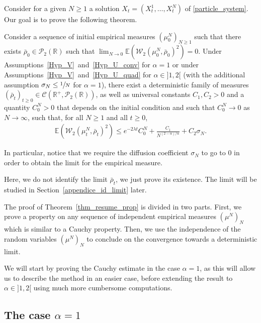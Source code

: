 Consider for a given $N\geq1$ a solution $X_t=(X^1_t,\dots, X^N_t)$ of \eqref{particle_system}. Our goal is to prove the following theorem.

\begin{theorem}\label{thm_resume_prop}
Consider a sequence of initial empirical measures $(\mu^N_0)_{N\geq1}$ such that there exists $\bar{\rho}_0 \in \mathcal P_2(\mathbb R)$ such that $\lim_{N\to0}\mathbb{E}\left(\mathcal{W}_2(\mu^N_0,\bar{\rho}_0)^2\right)=0$. Under Assumptions~\ref{Hyp_V}~and~\ref{Hyp_U_conv} for $\alpha=1$ or under Assumptions~\ref{Hyp_V}~and~\ref{Hyp_U_quad} for $\alpha\in{}]1,2[$ (with the additional assumption $\sigma_N\leq\sfrac{1}{N}$ for $\alpha=1$), there exist a deterministic family of measures $(\bar{\rho}_t)_{t\geq 0}\in\mathcal{C}(\mathbb{R}^+,\mathcal{P}_2(\mathbb{R}))$, as well as universal constants $C_1,C_2>0$ and a quantity $C_0^N>0$ that depends on the initial condition and such that $C_0^N\to0$ as $N\to\infty$, such that, for all $N\geq1$ and all $t\geq0$,
\begin{align*}
\mathbb{E}\left(\mathcal{W}_2(\mu^N_t,\bar{\rho}_t)^2\right)\leq e^{-2\lambda t}C_0^N+\frac{C_1}{N^{(2-\alpha)/\alpha}}+C_2\sigma_N.
\end{align*}
\end{theorem}

In particular, notice that we require the diffusion coefficient $\sigma_N$ to go to 0 in order to obtain the limit for the empirical measure.

Here, we do not identify the limit $\bar{\rho}_t$, we just prove its existence. The limit will be studied in Section~\ref{appendice_id_limit} later.

The proof of Theorem~\ref{thm_resume_prop} is divided in two parts. First, we prove a property on any sequence of independent empirical measures $(\mu^N)_N$ which is similar to a Cauchy property. Then, we use the independence of the random variables $(\mu^N)_N$ to conclude on the convergence towards a deterministic limit.

We will start by proving the Cauchy estimate in the case $\alpha=1$, as this will allow us to describe the method in an easier case, before extending the result to $\alpha\in{}]1,2[$ using much more cumbersome computations.

\subsection{The case $\alpha=1$}\label{sec_prop_alpha_1}

